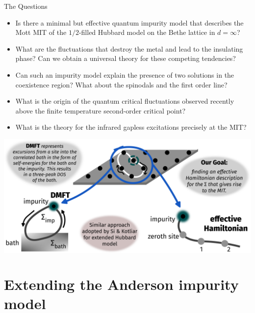 \documentclass[11pt,aspectratio=169]{beamer}
\begin{document}
\begin{frame}{The Questions}
	\begin{itemize}[<+->]
		\item Is there a \alert{minimal but effective quantum impurity model} that describes the Mott MIT of the $1/2$-filled Hubbard model on the Bethe lattice in \(d=\infty\)?\vspace{20pt}
		\item What are the \alert{fluctuations that destroy the metal} and lead to the insulating phase? Can we obtain a universal theory for these competing tendencies?\vspace{20pt}
		\item Can such an impurity model explain the \alert{presence of two solutions} in the coexistence region? What about the spinodals and the first order line?\vspace{20pt}
		\item What is the origin of the \alert{quantum critical fluctuations} observed recently above the finite temperature second-order critical point?\vspace{20pt}
		\item What is the theory for the infrared gapless excitations \alert{precisely at the MIT}?
\end{itemize}
\end{frame}

\begin{frame}
\hspace*{-0.05\textwidth}\includegraphics[width=1.1\textwidth]{contrast2.pdf}
\end{frame}

\section{Extending the Anderson impurity model}
\end{document}
